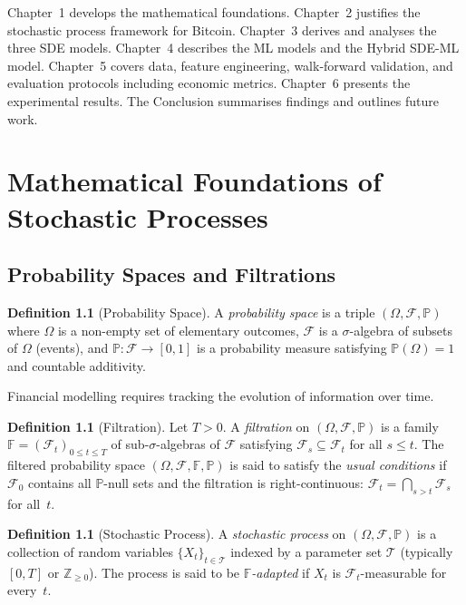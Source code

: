 \documentclass[12pt, a4paper, oneside]{report}
\theoremstyle{plain}
\theoremstyle{definition}
\newtheorem{definition}[theorem]{Definition}
\theoremstyle{remark}
\newcommand{\Prob}{\mathbb{P}}
\newcommand{\F}{\mathcal{F}}
\begin{document}
Chapter~1 develops the mathematical foundations.
Chapter~2 justifies the stochastic process framework for Bitcoin.
Chapter~3 derives and analyses the three SDE models.
Chapter~4 describes the ML models and the Hybrid SDE-ML model.
Chapter~5 covers data, feature engineering, walk-forward validation, and
evaluation protocols including economic metrics.
Chapter~6 presents the experimental results.
The Conclusion summarises findings and outlines future work.

\clearpage
\chapter{Mathematical Foundations of Stochastic Processes}
\label{ch:math}

\section{Probability Spaces and Filtrations}

\begin{definition}[Probability Space]
A \emph{probability space} is a triple $(\Omega, \F, \Prob)$ where $\Omega$ is a
non-empty set of elementary outcomes, $\F$ is a $\sigma$-algebra of subsets of
$\Omega$ (events), and $\Prob : \F \to [0,1]$ is a probability measure satisfying
$\Prob(\Omega) = 1$ and countable additivity.
\end{definition}

Financial modelling requires tracking the evolution of information over time.

\begin{definition}[Filtration]
Let $T > 0$.  A \emph{filtration} on $(\Omega, \F, \Prob)$ is a family
$\mathbb{F} = (\F_t)_{0 \leq t \leq T}$ of sub-$\sigma$-algebras of $\F$ satisfying
$\F_s \subseteq \F_t$ for all $s \leq t$.  The filtered probability space
$(\Omega, \F, \mathbb{F}, \Prob)$ is said to satisfy the \emph{usual conditions}
if $\F_0$ contains all $\Prob$-null sets and the filtration is right-continuous:
$\F_t = \bigcap_{s > t} \F_s$ for all~$t$.
\end{definition}

\begin{definition}[Stochastic Process]
A \emph{stochastic process} on $(\Omega, \F, \Prob)$ is a collection of random
variables $\{X_t\}_{t \in \mathcal{T}}$ indexed by a parameter set $\mathcal{T}$
(typically $[0,T]$ or $\mathbb{Z}_{\geq 0}$).  The process is said to be
\emph{$\mathbb{F}$-adapted} if $X_t$ is $\F_t$-measurable for every~$t$.
\end{definition}
\end{document}
